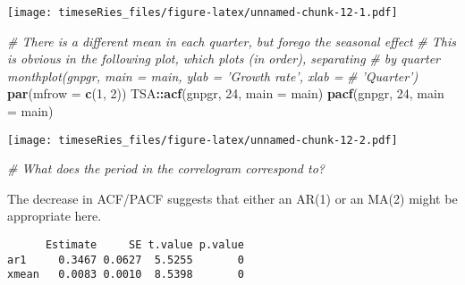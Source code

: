 \documentclass[]{book}
\newenvironment{Shaded}{\begin{snugshade}}{\end{snugshade}}
\newcommand{\KeywordTok}[1]{\textcolor[rgb]{0.13,0.29,0.53}{\textbf{#1}}}
\newcommand{\DataTypeTok}[1]{\textcolor[rgb]{0.13,0.29,0.53}{#1}}
\newcommand{\DecValTok}[1]{\textcolor[rgb]{0.00,0.00,0.81}{#1}}
\newcommand{\StringTok}[1]{\textcolor[rgb]{0.31,0.60,0.02}{#1}}
\newcommand{\CommentTok}[1]{\textcolor[rgb]{0.56,0.35,0.01}{\textit{#1}}}
\newcommand{\OtherTok}[1]{\textcolor[rgb]{0.56,0.35,0.01}{#1}}
\newcommand{\OperatorTok}[1]{\textcolor[rgb]{0.81,0.36,0.00}{\textbf{#1}}}
\newcommand{\NormalTok}[1]{#1}
\begin{document}
\texttt{[image: timeseRies\_files/figure-latex/unnamed-chunk-12-1.pdf]}

\begin{Shaded}
\begin{Highlighting}[]
\CommentTok{# There is a different mean in each quarter, but forego the seasonal effect}
\CommentTok{# This is obvious in the following plot, which plots (in order), separating}
\CommentTok{# by quarter monthplot(gnpgr, main = main, ylab = 'Growth rate', xlab =}
\CommentTok{# 'Quarter')}
\KeywordTok{par}\NormalTok{(}\DataTypeTok{mfrow =} \KeywordTok{c}\NormalTok{(}\DecValTok{1}\NormalTok{, }\DecValTok{2}\NormalTok{))}
\NormalTok{TSA}\OperatorTok{::}\KeywordTok{acf}\NormalTok{(gnpgr, }\DecValTok{24}\NormalTok{, }\DataTypeTok{main =}\NormalTok{ main)}
\KeywordTok{pacf}\NormalTok{(gnpgr, }\DecValTok{24}\NormalTok{, }\DataTypeTok{main =}\NormalTok{ main)}
\end{Highlighting}
\end{Shaded}

\texttt{[image: timeseRies\_files/figure-latex/unnamed-chunk-12-2.pdf]}

\begin{Shaded}
\begin{Highlighting}[]
\CommentTok{# What does the period in the correlogram correspond to?}
\end{Highlighting}
\end{Shaded}

The decrease in ACF/PACF suggests that either an AR(1) or an MA(2) might
be appropriate here.

\begin{Shaded}
\end{Shaded}

\begin{verbatim}
      Estimate     SE t.value p.value
ar1     0.3467 0.0627  5.5255       0
xmean   0.0083 0.0010  8.5398       0
\end{verbatim}

\begin{Shaded}
\end{Shaded}
\end{document}
